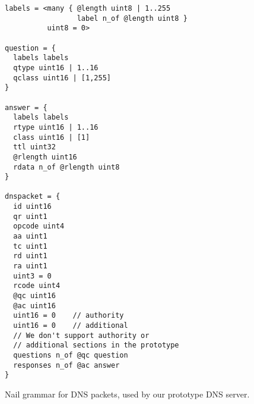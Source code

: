 \begin{figure}
\begin{verbatim}
labels = <many { @length uint8 | 1..255
                 label n_of @length uint8 }
          uint8 = 0>

question = {
  labels labels
  qtype uint16 | 1..16
  qclass uint16 | [1,255]
}

answer = {
  labels labels
  rtype uint16 | 1..16
  class uint16 | [1]
  ttl uint32
  @rlength uint16
  rdata n_of @rlength uint8
}

dnspacket = {
  id uint16
  qr uint1
  opcode uint4
  aa uint1
  tc uint1
  rd uint1
  ra uint1
  uint3 = 0
  rcode uint4
  @qc uint16
  @ac uint16
  uint16 = 0    // authority
  uint16 = 0    // additional
  // We don't support authority or
  // additional sections in the prototype
  questions n_of @qc question
  responses n_of @ac answer
}
\end{verbatim}
\caption{Nail grammar for DNS packets, used by our prototype DNS server.}
\label{fig:dns-full}
\end{figure}
